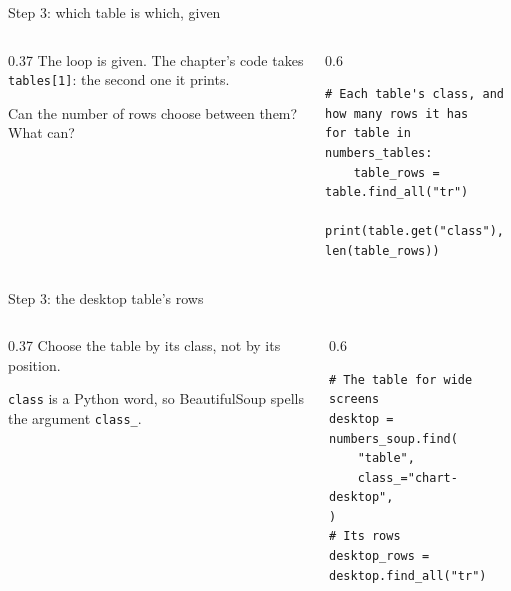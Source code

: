 \documentclass[9pt,aspectratio=169]{beamer}
\begin{document}
\begin{frame}[fragile]{Step 3: which table is which, given}
    \begin{columns}[T]
        \begin{column}{0.37\textwidth}
            The loop is given. The chapter's code takes \texttt{tables[1]}: the second one it prints.

            \medskip
            Can the number of rows choose between them? What can?
        \end{column}
        \begin{column}{0.6\textwidth}
\begin{lstlisting}
# Each table's class, and how many rows it has
for table in numbers_tables:
    table_rows = table.find_all("tr")
    print(table.get("class"), len(table_rows))
\end{lstlisting}
        \end{column}
    \end{columns}
\end{frame}

\begin{frame}[fragile]{Step 3: the desktop table's rows}
    \begin{columns}[T]
        \begin{column}{0.37\textwidth}
            Choose the table by its class, not by its position.

            \medskip
            \texttt{class} is a Python word, so BeautifulSoup spells the argument \texttt{class\_}.
        \end{column}
        \begin{column}{0.6\textwidth}
\begin{lstlisting}
# The table for wide screens
desktop = numbers_soup.find(
    "table",
    class_="chart-desktop",
)
# Its rows
desktop_rows = desktop.find_all("tr")
\end{lstlisting}
        \end{column}
    \end{columns}
\end{frame}
\end{document}
